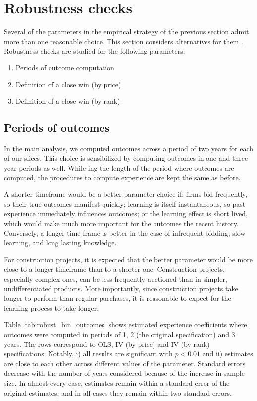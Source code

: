 \section{Robustness checks}
Several of the parameters in the empirical strategy of the previous section admit more than one reasonable choice. This section considers alternatives for them . Robustness checks are studied for the following parameters:
\begin{enumerate}
  \item Periods of outcome computation
  \item Definition of a close win (by price)
  \item Definition of a close win (by rank)
\end{enumerate}
\subsection{Periods of outcomes}
In the main analysis, we computed outcomes across a period of two years for each of our slices. This choice is sensibilized by computing outcomes in one and three year periods as well. While ing the length of the period where outcomes are computed, the procedures to compute experience are kept the same as before.

A shorter timeframe would be a better parameter choice if: firms bid frequently, so their true outcomes manifest quickly;  learning is itself instantaneous,  so past experience immediately influences outcomes; or  the learning effect is short lived, which would make much more important for the outcomes the recent history. Conversely, a longer time frame is better in the case of infrequent bidding, slow learning, and long lasting knowledge.

For construction projects, it is expected that the better parameter would be more close to a longer timeframe than to a shorter one. Construction projects, especially complex ones, can be less frequently auctioned than in simpler, undifferentiated products. More importantly, since construction projects take longer to perform than regular purchases, it is reasonable to expect for the learning process to take longer.

Table \ref{tab:robust_bin_outcomes} shows estimated experience coefficients where outcomes were computed in periods of 1, 2 (the original specification) and 3 years. The rows correspond to OLS, IV (by price) and IV (by rank) specifications. Notably, i) all results are significant with $p<0.01$ and ii) estimates are close to each other across different values of the parameter. Standard errors decrease with the number of years considered because of the increase in sample size. In almost every case, estimates remain within a standard error of the original estimates, and in all cases they remain within two standard errors.


